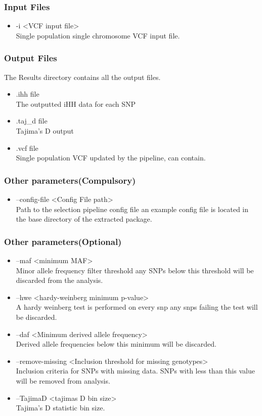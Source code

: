 \documentclass[a4paper,10pt]{article}
\begin{document}
\subsubsection{Input Files}
\begin{itemize}
\item -i <VCF input file>\\
Single population single chromosome VCF input file.
\end{itemize}
\subsubsection{Output Files}
The Results directory contains all the output files.
\begin{itemize}
\item .ihh file\\
The outputted iHH data for each SNP
\item .taj\_d file\\
Tajima's D output
\item .vcf file\\
Single population VCF updated by the pipeline, can contain.
\end{itemize}
\subsubsection{Other parameters(Compulsory)}
\begin{itemize}
\item --config-file <Config File path>\\
Path to the selection pipeline config file an example config file is located in the base directory of the extracted package.
\end{itemize}
\subsubsection{Other parameters(Optional)}
\begin{itemize}
\item --maf <minimum MAF>\\
Minor allele frequency filter threshold any SNPs below this threshold will be discarded from the analysis.
\item --hwe <hardy-weinberg minimum p-value>\\
A hardy weinberg test is performed on every snp any snps failing the test will be discarded.
\item --daf <Minimum derived allele frequency>\\
Derived allele frequencies below this minimum will be discarded.
\item --remove-missing <Inclusion threshold for missing genotypes>\\
Inclusion criteria for SNPs with missing data. SNPs with less than this value will be removed from analysis.
\item --TajimaD <tajimas D bin size>\\
Tajima's D statistic bin size.
\end{itemize}
\end{document}
